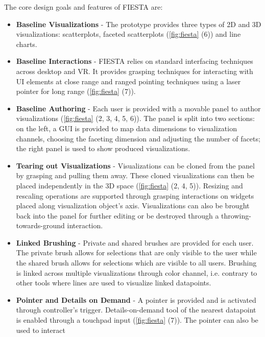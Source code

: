 \documentclass{vgtc}                          %
\begin{document}
\medskip

\noindent The core design goals and features of FIESTA are:
\begin{itemize}
	\item \textbf{Baseline Visualizations} - The prototype provides three types
	      of 2D and 3D visualizations: scatterplots, faceted scatterplots
	      (\autoref{fig:fiesta} (6)) and line charts.
	\item \textbf{Baseline Interactions} - FIESTA relies on standard
	      interfacing techniques across desktop and VR. It provides grasping
	      techniques for interacting with UI elements at close range and ranged
	      pointing techniques using a laser pointer for long range
	      (\autoref{fig:fiesta} (7)).
	\item \textbf{Baseline Authoring} - Each user is provided with a movable
	      panel to author visualizations (\autoref{fig:fiesta} (2, 3, 4, 5, 6)).
	      The panel is split into two sections: on the left, a GUI is provided
	      to map data dimensions to visualization channels, choosing the
	      faceting dimension and adjusting the number of facets; the right
	      panel is used to show produced visualizations.
	\item \textbf{Tearing out Visualizations} - Visualizations can be cloned
	      from the panel by grasping and pulling them away. These cloned
	      visualizations can then be placed independently in the 3D space
	      (\autoref{fig:fiesta} (2, 4, 5)). Resizing and rescaling operations are
	      supported through grasping interactions on widgets placed along
	      visualization object's axis. Visualizations can also be brought back
	      into the panel for further editing or be destroyed through a
	      throwing-towards-ground interaction.
	\item \textbf{Linked Brushing} - Private and shared brushes are provided
	      for each user. The private brush allows for selections that are only
	      visible to the user while the shared brush allows for selections
	      which are visible to all users. Brushing is linked across multiple
	      visualizations through color channel, i.e. contrary to other tools
	      where lines are used to visualize linked datapoints.
	\item \textbf{Pointer and Details on Demand} - A pointer is provided and is
	      activated through controller's trigger. Details-on-demand tool of the
	      nearest datapoint is enabled through a touchpad input
	      (\autoref{fig:fiesta} (7)). The pointer can also be used to interact

\end{itemize}
\end{document}
